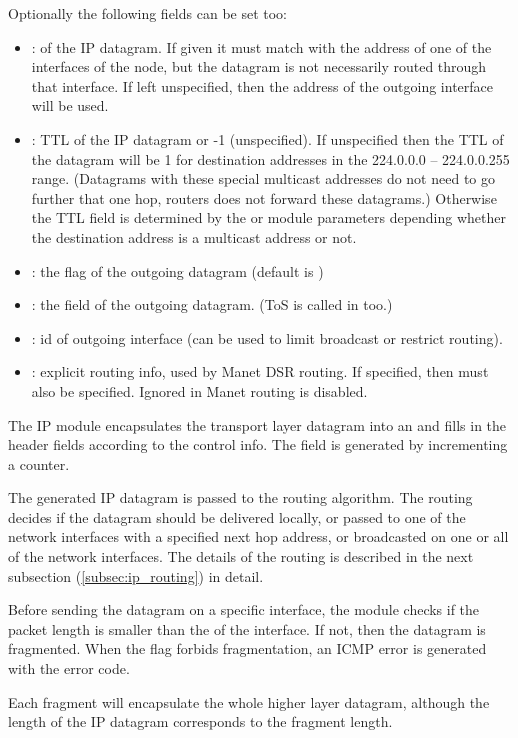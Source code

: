 Optionally the following fields can be set too:
\begin{itemize}
\item {}:  of the IP datagram. If given it must match with the
      address of one of the interfaces of the node, but the datagram is not necessarily
      routed through that interface. If left unspecified, then the address of the
      outgoing interface will be used.
\item {}: TTL of the IP datagram or -1 (unspecified). If unspecified then the TTL
      of the datagram will be 1 for destination addresses in the
      224.0.0.0 -- 224.0.0.255 range. (Datagrams with these special multicast addresses
      do not need to go further that one hop, routers does not forward these datagrams.)
      Otherwise the TTL field is determined by the  or
       module parameters depending whether the destination
      address is a multicast address or not.
\item {}: the  flag of the outgoing datagram (default is )
\item {}: the  field of the outgoing datagram.
      (ToS is called  in  too.)
\item {}: id of outgoing interface (can be used to limit broadcast or restrict routing).
\item {}: explicit routing info, used by Manet DSR routing. If specified, then
       must also be specified. Ignored in Manet routing is disabled.
\end{itemize}

The IP module encapsulates the transport layer datagram into an 
and fills in the header fields according to the control info. The 
field is generated by incrementing a counter.

The generated IP datagram is passed to the routing algorithm. The routing decides if the
datagram should be delivered locally, or passed to one of the network interfaces
with a specified next hop address, or broadcasted on one or all of the network interfaces.
The details of the routing is described in the next subsection (\ref{subsec:ip_routing})
in detail.

Before sending the datagram on a specific interface, the  module
checks if the packet length is smaller than the  of the interface.
If not, then the datagram is fragmented. When the  flag
forbids fragmentation, an  ICMP error is generated
with the  error code.
\begin{note}
Each fragment will encapsulate the whole higher layer datagram, although the
length of the IP datagram corresponds to the fragment length.
\end{note}

